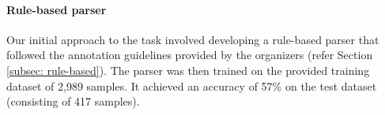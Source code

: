 \documentclass[11pt]{article}
\begin{document}
\paragraph{Rule-based parser} Our initial approach to the task involved developing a rule-based parser that followed the annotation guidelines provided by the organizers (refer Section \ref{subsec: rule-based}). The parser was then trained on the provided training dataset of 2,989 samples. It achieved an accuracy of 57\% on the test dataset (consisting of 417 samples). 








\end{document}
